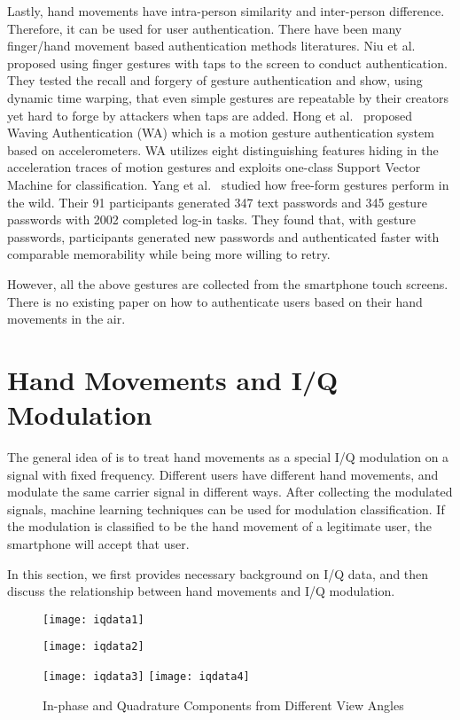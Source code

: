 Lastly, hand movements have intra-person similarity and inter-person difference. Therefore, it can be used for user authentication. There have been many finger/hand movement based authentication methods literatures. Niu et al.~\cite{niu2011gesture} proposed using finger gestures with taps to the screen to conduct authentication. They tested the recall and forgery of gesture authentication and show, using dynamic time warping, that even simple gestures are repeatable by their creators yet hard to forge by attackers when taps are added. Hong et al.~\cite{hong2015waving} proposed Waving Authentication (WA) which is a motion gesture authentication system based on accelerometers. WA utilizes eight distinguishing features hiding in the acceleration traces of motion gestures and exploits one-class Support Vector Machine for classification. Yang et al.~\cite{yang2016free} studied how free-form gestures perform in the wild. Their 91 participants generated 347 text passwords and 345 gesture passwords with 2002 completed log-in tasks. They found that, with gesture passwords, participants generated new passwords and authenticated faster with comparable memorability while being more willing to retry. 

However, all the above gestures are collected from the smartphone touch screens. There is no existing paper on how to authenticate users based on their hand movements in the air.

\section{Hand Movements and I/Q Modulation}\label{sec:handIQ}
The general idea of {\uu} is to treat hand movements as a special I/Q modulation on a signal with fixed frequency. Different users have different hand movements, and modulate the same carrier signal in different ways. After collecting the modulated signals, machine learning techniques can be used for modulation classification. If the modulation is classified to be the hand movement of a legitimate user, the smartphone will accept that user. 

In this section, we first provides necessary background on I/Q data, and then discuss the relationship between hand movements and I/Q modulation.

\begin{figure}[!h]
	\centering
	\texttt{[image: iqdata1]}
	\begin{minipage}{.4\linewidth}
		\texttt{[image: iqdata2]}
	\end{minipage}
	\hfil
	\begin{minipage}{.5\linewidth}
		\texttt{[image: iqdata3]}
		\texttt{[image: iqdata4]}
	\end{minipage}
	\caption{In-phase and Quadrature Components from Different View Angles}
	\label{fig:iqdata}
\end{figure}

